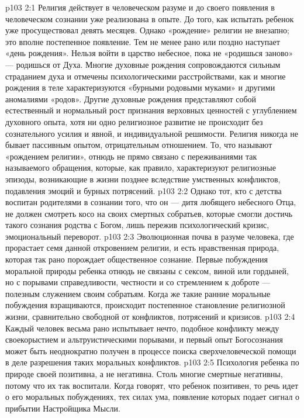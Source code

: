 \vs p103 2:1 Религия действует в человеческом разуме и до своего появления в человеческом сознании уже реализована в опыте. До того, как испытать  ребенок уже просуществовал девять месяцев. Однако «рождение» религии не внезапно; это вполне постепенное появление. Тем не менее рано или поздно наступает «день рождения». Нельзя войти в царство небесное, пока не «родишься заново» --- родишься от Духа. Многие духовные рождения сопровождаются сильным страданием духа и отмечены психологическими расстройствами, как и многие рождения в теле характеризуются «бурными родовыми муками» и другими аномалиями «родов». Другие духовные рождения представляют собой естественный и нормальный рост признания верховных ценностей с углублением духовного опыта, хотя ни одно религиозное развитие не происходит без сознательного усилия и явной, и индивидуальной решимости. Религия никогда не бывает пассивным опытом, отрицательным отношением. То, что называют «рождением религии», отнюдь не прямо связано с переживаниями так называемого обращения, которые, как правило, характеризуют религиозные эпизоды, возникающие в жизни позднее вследствие умственных конфликтов, подавления эмоций и бурных потрясений.
\vs p103 2:2 Однако тот, кто с детства воспитан родителями в сознании того, что он --- дитя любящего небесного Отца, не должен смотреть косо на своих смертных собратьев, которые смогли достичь такого сознания родства с Богом, лишь пережив психологический кризис, эмоциональный переворот.
\vs p103 2:3 Эволюционная почва в разуме человека, где прорастает семя данной откровением религии, и есть нравственная природа, которая так рано порождает общественное сознание. Первые побуждения моральной природы ребенка отнюдь не связаны с сексом, виной или гордыней, но с порывами справедливости, честности и со стремлением к доброте --- полезным служением своим собратьям. Когда же такие ранние моральные побуждения взращиваются, происходит постепенное становление религиозной жизни, сравнительно свободной от конфликтов, потрясений и кризисов.
\vs p103 2:4 Каждый человек весьма рано испытывает нечто, подобное конфликту между своекорыстием и альтруистическими порывами, и первый опыт Богосознания может быть неоднократно получен в процессе поиска сверхчеловеческой помощи в деле разрешения таких моральных конфликтов.
\vs p103 2:5 Психология ребенка по природе своей позитивна, а не негативна. Столь многие смертные негативны, потому что их так воспитали. Когда говорят, что ребенок позитивен, то речь идет о его моральных побуждениях, тех силах ума, появление которых подает сигнал о прибытии Настройщика Мысли.
